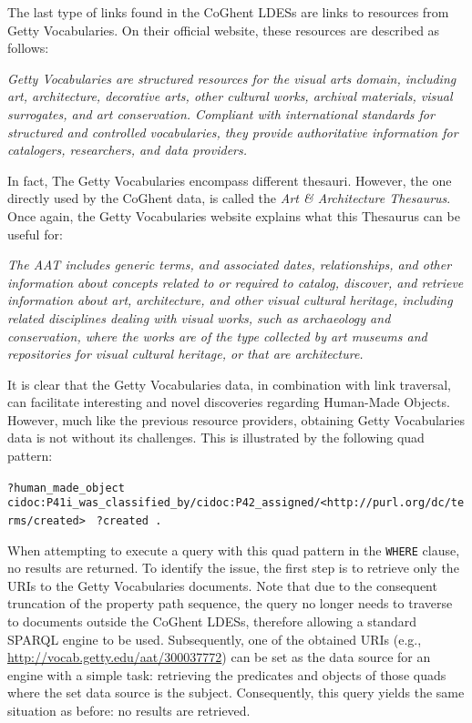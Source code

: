 The last type of links found in the CoGhent LDESs are links to resources from Getty Vocabularies. On their official website, these resources are described as follows:
\begin{flushright}
    \textit{Getty Vocabularies are structured resources for the visual arts domain, including art, architecture, decorative arts, other cultural works, archival materials, visual surrogates, and art conservation. Compliant with international standards for structured and controlled vocabularies, they provide authoritative information for catalogers, researchers, and data providers.}
    \linebreak\citep{gettyvocabularies}
\end{flushright}

In fact, The Getty Vocabularies encompass different thesauri. However, the one directly used by the CoGhent data, is called the \textit{Art \& Architecture Thesaurus}. Once again, the Getty Vocabularies website explains what this Thesaurus can be useful for:
\begin{flushright}
    \textit{The AAT includes generic terms, and associated dates, relationships, and other information about concepts related to or required to catalog, discover, and retrieve information about art, architecture, and other visual cultural heritage, including related disciplines dealing with visual works, such as archaeology and conservation, where the works are of the type collected by art museums and repositories for visual cultural heritage, or that are architecture.}
    \linebreak\citep{getty2023aat}
\end{flushright}

It is clear that the Getty Vocabularies data, in combination with link traversal, can facilitate interesting and novel discoveries regarding Human-Made Objects. However, much like the previous resource providers, obtaining Getty Vocabularies data is not without its challenges. This is illustrated by the following quad pattern:
\begin{flushleft}
    \texttt{?human_made_object}
    \texttt{  cidoc:P41i_was_classified_by/cidoc:P42_assigned/<http://purl.org/dc/terms/created>}
    \texttt{      ?created .}
\end{flushleft}
When attempting to execute a query with this quad pattern in the \texttt{WHERE} clause, no results are returned. To identify the issue, the first step is to retrieve only the URIs to the Getty Vocabularies documents. Note that due to the consequent truncation of the property path sequence, the query no longer needs to traverse to documents outside the CoGhent LDESs, therefore allowing a standard SPARQL engine to be used. Subsequently, one of the obtained URIs (e.g., \url{http://vocab.getty.edu/aat/300037772}) can be set as the data source for an engine with a simple task: retrieving the predicates and objects of those quads where the set data source is the subject. Consequently, this query yields the same situation as before: no results are retrieved.

